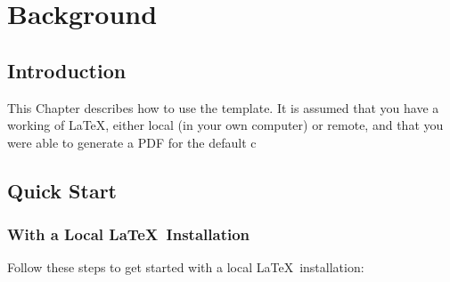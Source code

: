 
%

\chapter{Background}
\label{cha:background}



\section{Introduction}
\label{sec:introduction}

This Chapter describes how to use the template.  It is assumed that you have a working  of \LaTeX, either local (in your own computer) or remote, and that you were able to generate a PDF for the default c


\section{Quick Start}
\label{sec:quick_started}

\subsection{With a Local \LaTeX\ Installation} %
\label{sub:with_a_local_latex_installation}

Follow these steps to get started with a local \LaTeX\ installation:
